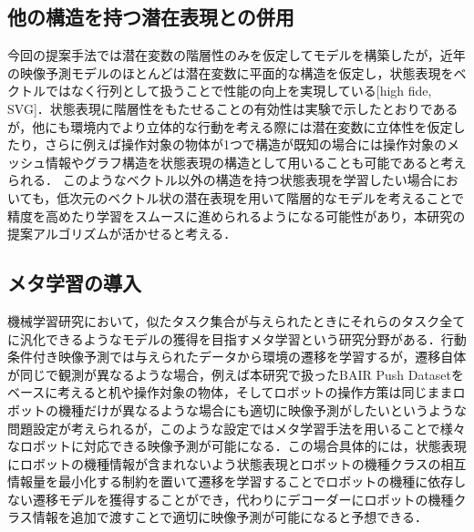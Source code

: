 \subsection{他の構造を持つ潜在表現との併用}
今回の提案手法では潜在変数の階層性のみを仮定してモデルを構築したが，近年の映像予測モデルのほとんどは潜在変数に平面的な構造を仮定し，状態表現をベクトルではなく行列として扱うことで性能の向上を実現している[high fide, SVG]．状態表現に階層性をもたせることの有効性は実験で示したとおりであるが，他にも環境内でより立体的な行動を考える際には潜在変数に立体性を仮定したり，さらに例えば操作対象の物体が1つで構造が既知の場合には操作対象のメッシュ情報やグラフ構造を状態表現の構造として用いることも可能であると考えられる．
このようなベクトル以外の構造を持つ状態表現を学習したい場合においても，低次元のベクトル状の潜在表現を用いて階層的なモデルを考えることで精度を高めたり学習をスムースに進められるようになる可能性があり，本研究の提案アルゴリズムが活かせると考える．

\subsection{メタ学習の導入}
機械学習研究において，似たタスク集合が与えられたときにそれらのタスク全てに汎化できるようなモデルの獲得を目指すメタ学習という研究分野がある．行動条件付き映像予測では与えられたデータから環境の遷移を学習するが，遷移自体が同じで観測が異なるような場合，例えば本研究で扱ったBAIR Push Datasetをベースに考えると机や操作対象の物体，そしてロボットの操作方策は同じままロボットの機種だけが異なるような場合にも適切に映像予測がしたいというような問題設定が考えられるが，このような設定ではメタ学習手法を用いることで様々なロボットに対応できる映像予測が可能になる．この場合具体的には，状態表現にロボットの機種情報が含まれないよう状態表現とロボットの機種クラスの相互情報量を最小化する制約を置いて遷移を学習することでロボットの機種に依存しない遷移モデルを獲得することができ，代わりにデコーダーにロボットの機種クラス情報を追加で渡すことで適切に映像予測が可能になると予想できる．

